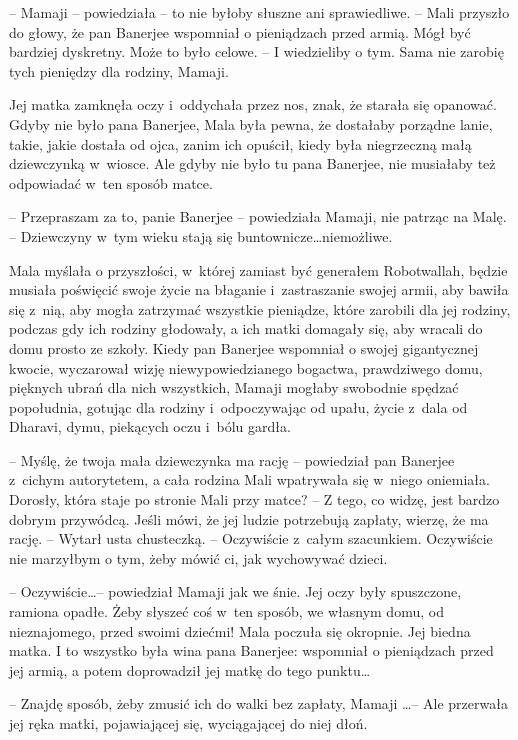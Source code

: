 \documentclass[oneside,polish,11pt,rmheadings]{mwbk}
\begin{document}
-- Mamaji -- powiedziała -- to nie byłoby słuszne ani sprawiedliwe. -- Mali przyszło do głowy, że pan Banerjee wspomniał o pieniądzach przed armią. Mógł być bardziej dyskretny. Może to było celowe. -- I wiedzieliby o tym. Sama nie zarobię tych pieniędzy dla rodziny, Mamaji. 


Jej matka zamknęła oczy i~oddychała przez nos, znak, że starała się opanować. Gdyby nie było pana Banerjee, Mala była pewna, że dostałaby porządne lanie, takie, jakie dostała od ojca, zanim ich opuścił, kiedy była niegrzeczną małą dziewczynką w~wiosce. Ale gdyby nie było tu pana Banerjee, nie musiałaby też odpowiadać w~ten sposób matce. 


-- Przepraszam za to, panie Banerjee -- powiedziała Mamaji, nie patrząc na Malę. -- Dziewczyny w~tym wieku stają się buntownicze\ldots  niemożliwe. 


Mala myślała o przyszłości, w~której zamiast być generałem Robotwallah, będzie musiała poświęcić swoje życie na błaganie i~zastraszanie swojej armii, aby bawiła się z~nią, aby mogła zatrzymać wszystkie pieniądze, które zarobili dla jej rodziny, podczas gdy ich rodziny głodowały, a ich matki domagały się, aby wracali do domu prosto ze szkoły. Kiedy pan Banerjee wspomniał o swojej gigantycznej kwocie, wyczarował wizję niewypowiedzianego bogactwa, prawdziwego domu, pięknych ubrań dla nich wszystkich, Mamaji mogłaby swobodnie spędzać popołudnia, gotując dla rodziny i~odpoczywając od upału, życie z~dala od Dharavi, dymu, piekących oczu i~bólu gardła. 


-- Myślę, że twoja mała dziewczynka ma rację -- powiedział pan Banerjee z~cichym autorytetem, a cała rodzina Mali wpatrywała się w~niego oniemiała. Dorosły, która staje po stronie Mali przy matce? -- Z tego, co widzę, jest bardzo dobrym przywódcą. Jeśli mówi, że jej ludzie potrzebują zapłaty, wierzę, że ma rację. -- Wytarł usta chusteczką. -- Oczywiście z~całym szacunkiem. Oczywiście nie marzyłbym o tym, żeby mówić ci, jak wychowywać dzieci. 


-- Oczywiście\ldots  -- powiedział Mamaji jak we śnie. Jej oczy były spuszczone, ramiona opadłe. Żeby słyszeć coś w~ten sposób, we własnym domu, od nieznajomego, przed swoimi dziećmi! Mala poczuła się okropnie. Jej biedna matka. I to wszystko była wina pana Banerjee: wspomniał o pieniądzach przed jej armią, a potem doprowadził jej matkę do tego punktu\ldots  


-- Znajdę sposób, żeby zmusić ich do walki bez zapłaty, Mamaji \ldots  -- Ale przerwała jej ręka matki, pojawiającej się, wyciągającej do niej dłoń. 
\end{document}
